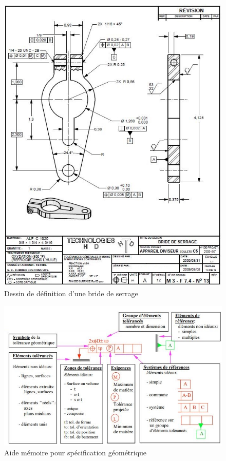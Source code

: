 \documentclass[12pt]{article}
\begin{document}
\begin{figure}
\centering
\includegraphics[width=0.9\linewidth]{Images/dessin1.JPG}
\caption{Dessin de définition d'une bride de serrage}
\label{bride}
\end{figure}




\begin{figure}
\centering
\includegraphics[width=0.9\linewidth]{Images/gps.JPG}
\caption{Aide mémoire pour spécification géométrique}
\label{gps}
\end{figure}
\end{document}
